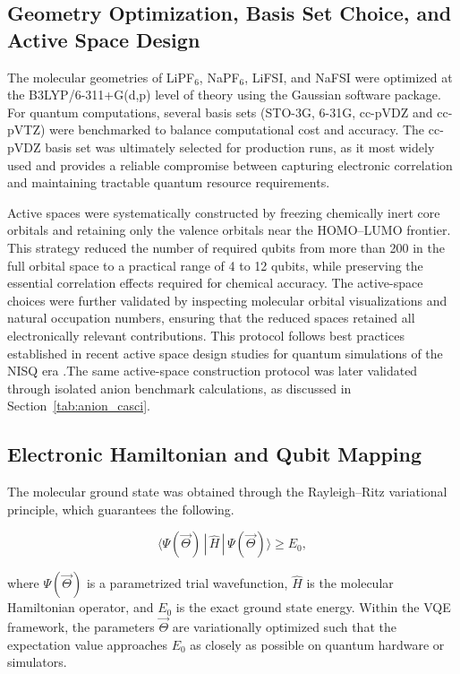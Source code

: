 \documentclass[num-refs]{wiley-article}
\begin{document}
\subsection{Geometry Optimization, Basis Set Choice, and Active Space Design}

The molecular geometries of LiPF$_6$, NaPF$_6$, LiFSI, and NaFSI were optimized at the B3LYP/6-311+G(d,p) level of theory using the Gaussian software package\cite{g16}. For quantum computations, several basis sets (STO-3G, 6-31G, cc-pVDZ and cc-pVTZ) were benchmarked to balance computational cost and accuracy. The cc-pVDZ basis set was ultimately selected for production runs, as it most widely used \cite{kaliakin2025implicit} and provides a reliable compromise between capturing electronic correlation and maintaining tractable quantum resource requirements.  

Active spaces were systematically constructed by freezing chemically inert core orbitals and retaining only the valence orbitals near the HOMO–LUMO frontier. This strategy reduced the number of required qubits from more than 200 in the full orbital space to a practical range of 4 to 12 qubits, while preserving the essential correlation effects required for chemical accuracy. The active-space choices were further validated by inspecting molecular orbital visualizations and natural occupation numbers, ensuring that the reduced spaces retained all electronically relevant contributions. This protocol follows best practices established in recent active space design studies for quantum simulations of the NISQ era \cite{motta2020quantum, tilly2022variational}.The same active-space construction protocol was later validated through isolated anion benchmark calculations, as discussed in Section~\ref{tab:anion_casci}.


\subsection{Electronic Hamiltonian and Qubit Mapping}

The molecular ground state was obtained through the Rayleigh--Ritz variational principle, which guarantees the following.

\begin{equation}
\langle \Psi(\vec{\Theta}) \,|\, \hat{H} \,|\, \Psi(\vec{\Theta}) \rangle \geq E_{0},
\end{equation}

where $\Psi(\vec{\Theta})$ is a parametrized trial wavefunction, $\hat{H}$ is the molecular Hamiltonian operator, and $E_{0}$ is the exact ground state energy. Within the VQE framework, the parameters $\vec{\Theta}$ are variationally optimized such that the expectation value approaches $E_{0}$ as closely as possible on quantum hardware or simulators.
\end{document}
